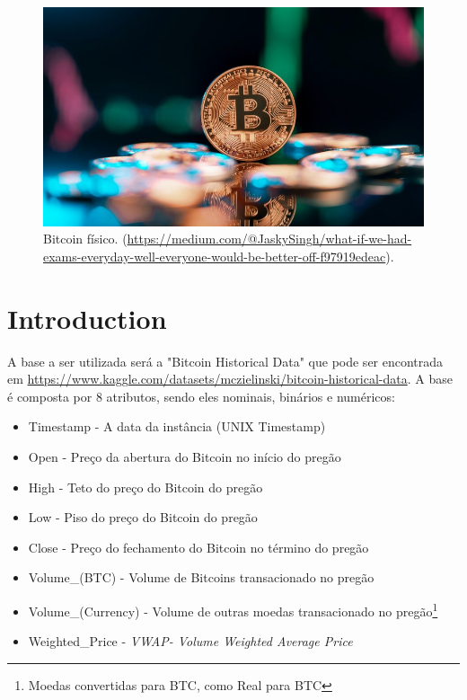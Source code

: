 \documentclass[sigplan,screen]{acmart}
\begin{document}
\begin{figure}[h]
  \centering
  \includegraphics[width=\linewidth]{btc.jpg}
  \caption{Bitcoin físico. (\url{https://medium.com/@JaskySingh/what-if-we-had-exams-everyday-well-everyone-would-be-better-off-f97919edeac}).}
\end{figure}



\section{Introduction}
A base a ser utilizada será a "Bitcoin Historical Data" que pode ser encontrada em \url{https://www.kaggle.com/datasets/mczielinski/bitcoin-historical-data}.
A base é composta por 8 atributos, sendo eles nominais, binários e numéricos:
\begin{itemize}
    \item Timestamp - A data da instância (UNIX Timestamp) 
    \item Open - Preço da abertura do Bitcoin no início do pregão
    \item High - Teto do preço do Bitcoin do pregão
    \item Low - Piso do preço do Bitcoin do pregão
    \item Close - Preço do fechamento do Bitcoin no término do pregão
    \item Volume\_(BTC) - Volume de Bitcoins transacionado no pregão
    \item Volume\_(Currency) - Volume de outras moedas transacionado no pregão\footnote{Moedas convertidas para BTC, como Real para BTC}
    \item Weighted\_Price - \textit{VWAP- Volume Weighted Average Price}
\end{itemize}
\end{document}
